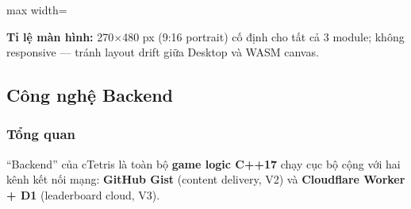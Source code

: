 \documentclass[12pt,a4paper]{article}
\begin{document}
\begin{center}
\begin{adjustbox}{max width=\linewidth}
\end{adjustbox}
\end{center}

\noindent\textbf{Tỉ lệ màn hình:} 270$\times$480 px (9:16 portrait) cố định cho tất cả 3 module; không responsive --- tránh layout drift giữa Desktop và WASM canvas.

\subsection{Công nghệ Backend}

\subsubsection{Tổng quan}
``Backend'' của cTetris là toàn bộ \textbf{game logic C++17} chạy cục bộ cộng với hai kênh kết nối mạng: \textbf{GitHub Gist} (content delivery, V2) và \textbf{Cloudflare Worker + D1} (leaderboard cloud, V3).
\end{document}
